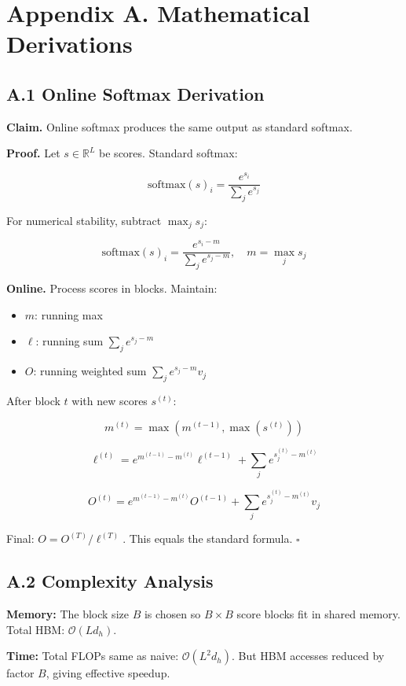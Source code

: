 \section{Appendix A. Mathematical Derivations}

\subsection{A.1 Online Softmax Derivation}

\textbf{Claim.} Online softmax produces the same output as standard softmax.

\textbf{Proof.} Let $s \in \mathbb{R}^L$ be scores. Standard softmax:

\[
\text{softmax}(s)_i = \frac{e^{s_i}}{\sum_j e^{s_j}}
\tag{A.1}
\]

For numerical stability, subtract $\max_j s_j$:

\[
\text{softmax}(s)_i = \frac{e^{s_i - m}}{\sum_j e^{s_j - m}}, \quad m = \max_j s_j
\tag{A.2}
\]

\textbf{Online.} Process scores in blocks. Maintain:
\begin{itemize}
\item $m$: running max
\item $\ell$: running sum $\sum_j e^{s_j - m}$
\item $O$: running weighted sum $\sum_j e^{s_j - m} v_j$

\end{itemize}
After block $t$ with new scores $s^{(t)}$:

\[
m^{(t)} = \max(m^{(t-1)}, \max(s^{(t)}))
\tag{A.3}
\]

\[
\ell^{(t)} = e^{m^{(t-1)} - m^{(t)}} \ell^{(t-1)} + \sum_j e^{s_j^{(t)} - m^{(t)}}
\tag{A.4}
\]

\[
O^{(t)} = e^{m^{(t-1)} - m^{(t)}} O^{(t-1)} + \sum_j e^{s_j^{(t)} - m^{(t)}} v_j
\tag{A.5}
\]

Final: $O = O^{(T)} / \ell^{(T)}$. This equals the standard formula. $\square$

\subsection{A.2 Complexity Analysis}

\textbf{Memory:} The block size $B$ is chosen so $B \times B$ score blocks fit 
in shared memory. Total HBM: $\mathcal{O}(L d_h)$.

\textbf{Time:} Total FLOPs same as naive: $\mathcal{O}(L^2 d_h)$. But HBM 
accesses reduced by factor $B$, giving effective speedup.

